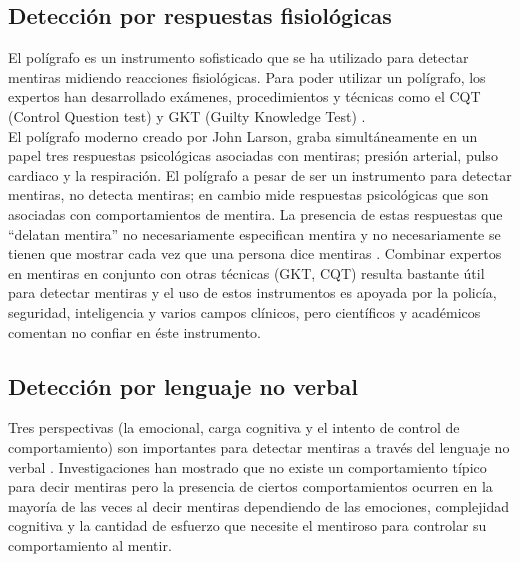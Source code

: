 \begin{onehalfspacing}
\subsection{Detección por respuestas fisiológicas}
\label{sec:Respuestas_psicologicas}

El polígrafo es un instrumento sofisticado que se ha utilizado para detectar mentiras midiendo reacciones fisiológicas. Para poder utilizar un polígrafo, los expertos han desarrollado exámenes, procedimientos y técnicas como el CQT (Control Question test) y  GKT (Guilty Knowledge Test) \cite{Staunton2011AnExamination}.\\


El polígrafo moderno creado por John Larson, graba simultáneamente en un papel tres respuestas psicológicas asociadas con mentiras; presión arterial, pulso cardiaco y la respiración. El polígrafo a pesar de ser un instrumento para detectar mentiras, no detecta mentiras; en cambio mide respuestas psicológicas que son asociadas con comportamientos de mentira. La presencia de estas respuestas que “delatan mentira” no necesariamente especifican mentira y no necesariamente se tienen que mostrar cada vez que una persona dice mentiras \cite{Vrij2000DetectingBehavior}. Combinar expertos en mentiras en conjunto con otras técnicas (GKT, CQT) resulta bastante útil para detectar mentiras y el uso de estos instrumentos es apoyada por la policía, seguridad, inteligencia y varios campos clínicos, pero científicos y académicos comentan no confiar en éste instrumento.

\subsection{Detección por lenguaje no verbal}
\label{sec:Lenguaje_no_verbal}
Tres perspectivas (la emocional, carga cognitiva y el intento de control de comportamiento) son importantes para detectar mentiras a través del lenguaje no verbal \cite{DePaulo2003CuesDeception}. Investigaciones han mostrado que no existe un comportamiento típico para decir mentiras pero la presencia de ciertos comportamientos ocurren en la mayoría de las veces al decir mentiras dependiendo de las emociones, complejidad cognitiva y  la cantidad de esfuerzo que necesite el mentiroso para controlar su comportamiento al mentir.\\


\end{onehalfspacing}
